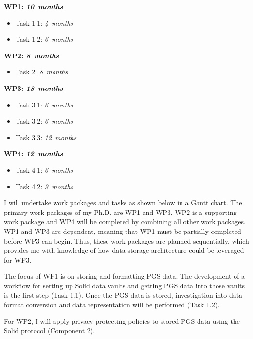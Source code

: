 \documentclass[a4paper,11pt]{article}
\begin{document}
\begin{refsection}
\begin{adjustwidth}{0cm}{0cm}
	\parindent 0pt
	\newcommand\duration[1]{\hfill\emph{#1~months}}
  
	\textbf{WP1:      \WPa  \duration{10}}
	\begin{itemize}
	  \item Task 1.1: \WPaa \duration{ 4}
	  \item Task 1.2: \WPab \duration{ 6}
	\end{itemize}
	\smallskip
  
	\textbf{WP2:      \WPb  \duration{8}}
	\begin{itemize}
	  \item Task 2: \WPba \duration{ 8}
	\end{itemize}
  \smallskip
	
	\textbf{WP3:      \WPc  \duration{18}}
	\begin{itemize}
	  \item Task 3.1: \WPca \duration{ 6}
	  \item Task 3.2: \WPcb \duration{ 6}
	  \item Task 3.3: \WPcc \duration{ 12}
	\end{itemize}
	\smallskip
	
	\textbf{WP4:      \WPd  \duration{ 12}}
  \begin{itemize}
	  \item Task 4.1: \WPda \duration{ 6}
	  \item Task 4.2: \WPdb \duration{ 9}
	\end{itemize}
\end{adjustwidth}

\noindent
I will undertake work packages and tasks as shown below in a Gantt chart.
The primary work packages of my Ph.D. are WP1 and WP3.
WP2 is a supporting work package and WP4 will be completed by combining all other work packages.
WP1 and WP3 are dependent, meaning that WP1 must be partially completed before WP3 can begin.
Thus, these work packages are planned sequentially, which provides me with knowledge of how data storage architecture could be leveraged for WP3.

The focus of WP1 is on storing and formatting PGS data.
The development of a workflow for setting up Solid data vaults and getting PGS data into those vaults is the first step (Task 1.1).
Once the PGS data is stored, investigation into data format conversion and data representation will be performed (Task 1.2).

For WP2, I will apply privacy protecting policies to stored PGS data using the Solid protocol (Component 2).


\end{refsection}
\end{document}
